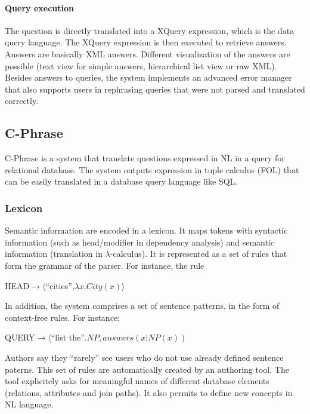 \documentclass[10pt,journal,letterpaper,compsoc]{IEEEtran}
\begin{document}
\paragraph{Query execution}
The question is directly
translated into a XQuery expression, which is the data query language. The
XQuery expression is then executed to retrieve answers.
Answers are basically XML answers. Different visualization
of the answers are possible (text view for simple answers, hierarchical list
view or raw XML).
Besides answers to queries, the system implements an advanced error manager
that also supports users in rephrasing queries that were not parsed and
translated correctly.






\subsection{{\sc C-Phrase}~\cite{Minock:2010:CSB:1715942.1716190}}
{\sc C-Phrase} is a system that translate questions expressed in NL in a query
for relational database.
The system outputs expression in tuple calculus (FOL) that can be easily
translated in a database query language like SQL.

\subsubsection{Lexicon}
Semantic information are encoded in a lexicon. It maps tokens with syntactic
information (such as head/modifier in dependency analysis) and semantic
information (translation in $\lambda$-calculus).
It is represented as a set of rules that form the grammar of the parser.
For instance, the rule
\begin{center}
HEAD$\rightarrow\langle$``cities'',$\lambda x.City(x)\rangle$
\end{center}
In addition, the system comprises a set of sentence patterns, in the form of
context-free rules. For instance:
\begin{center}
QUERY$\rightarrow\langle$``list the''$.NP, answers({x|NP(x)})$
\end{center}
Authors say they ``rarely'' see users who do not use already defined sentence
paterns.
This set of rules are automatically created by an authoring tool.
The tool explicitely asks for meaningful names of different database elements
(relations, attributes and join paths). 
It also permits to define new concepts in NL language. 
\end{document}
